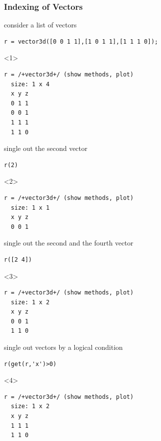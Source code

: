 \documentclass[compress]{beamer}
\begin{document}
\begin{frame}[fragile]
  \frametitle{Indexing of Vectors}

  \begin{overlayarea}{\textwidth}{8cm}

    consider a list of vectors
    \begin{lstlisting}[style=input]
r = vector3d([0 0 1 1],[1 0 1 1],[1 1 1 0]);
    \end{lstlisting}

    \begin{onlyenv}<1>
      \vspace{-.3cm}
      \begin{lstlisting}[style=output]
r = /+vector3d+/ (show methods, plot)
  size: 1 x 4
  x y z
  0 1 1
  0 0 1
  1 1 1
  1 1 0
      \end{lstlisting}
    \end{onlyenv}

    \pause \medskip

    single out the second vector
    \begin{lstlisting}[style=input]
r(2)
    \end{lstlisting}

    \begin{onlyenv}<2>
      \vspace{-0.3cm}
      \begin{lstlisting}[style=output]
r = /+vector3d+/ (show methods, plot)
  size: 1 x 1
  x y z
  0 0 1
      \end{lstlisting}
    \end{onlyenv}

    \pause \medskip

    single out the second and the fourth vector
    \begin{lstlisting}[style=input]
r([2 4])
    \end{lstlisting}
    \begin{onlyenv}<3>
      \vspace{-0.3cm}
      \begin{lstlisting}[style=output]
r = /+vector3d+/ (show methods, plot)
  size: 1 x 2
  x y z
  0 0 1
  1 1 0
      \end{lstlisting}
    \end{onlyenv}

  \pause \medskip

single out vectors by a logical condition
    \begin{lstlisting}[style=input]
r(get(r,'x')>0)
    \end{lstlisting}
        \begin{onlyenv}<4>
          \vspace{-0.3cm}
      \begin{lstlisting}[style=output]
r = /+vector3d+/ (show methods, plot)
  size: 1 x 2
  x y z
  1 1 1
  1 1 0
     \end{lstlisting}
    \end{onlyenv}


\end{overlayarea}
\end{frame}
\end{document}
